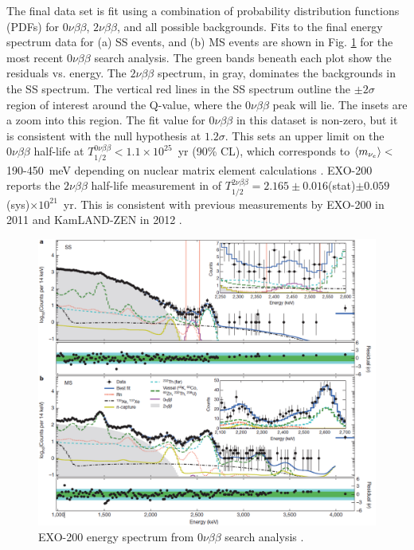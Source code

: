 The final data set is fit using a combination of probability distribution functions (PDFs) for $0\nu\beta\beta$, $2\nu\beta\beta$, and all possible backgrounds.  Fits to the final energy spectrum data for (a) SS events, and (b) MS events are shown in Fig. \ref{fig:exo200data} for the most recent $0\nu\beta\beta$ search analysis.  The green bands beneath each plot show the residuals vs. energy.  The $2\nu\beta\beta$ spectrum, in gray, dominates the backgrounds in the SS spectrum.  The vertical red lines in the SS spectrum outline the $\pm 2 \sigma$ region of interest around the Q-value, where the $0\nu\beta\beta$ peak will lie.  The insets are a zoom into this region.  The fit value for $0\nu\beta\beta$ in this dataset is non-zero, but it is consistent with the null hypothesis at $1.2 \sigma$.  This sets an upper limit on the $0\nu\beta\beta$ half-life at $T^{0\nu\beta\beta}_{1/2} < 1.1 \times 10^{25}$~yr (90\% CL), which corresponds to $\braket{m_{\nu_{e}}} < $190-450~meV depending on nuclear matrix element calculations \cite{EXO2000nuNature}.  EXO-200 reports the $2\nu\beta\beta$ half-life measurement in \cite{EXO200TwoNuLong} of $T^{2\nu\beta\beta}_{1/2} = 2.165 \pm 0.016$(stat)$ \pm 0.059$(sys)$ \times 10^{21}$~yr.  This is consistent with previous measurements by EXO-200 in 2011 \cite{EXO200TwoNuOriginal} and KamLAND-ZEN in 2012 \cite{KamLAND}.

\begin{figure}[H]
	\centering
	\includegraphics[width=.95\textwidth]{figures/0nu_spectrum_nature.png}
	\caption{EXO-200 energy spectrum from $0\nu\beta\beta$ search analysis \cite{EXO2000nuNature}.}
\label{fig:exo200data}
\end{figure}

